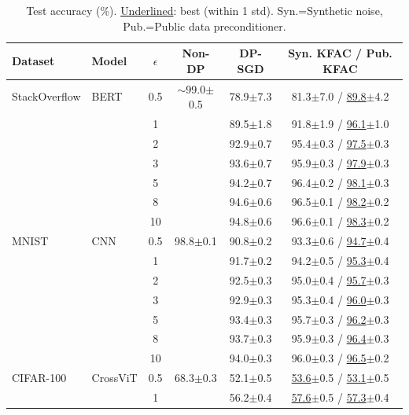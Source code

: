 \documentclass{article}
\theoremstyle{plain}
\theoremstyle{definition}
\theoremstyle{remark}
\begin{document}
\begin{table}[h!]
\centering
\footnotesize
\setlength{\tabcolsep}{4pt}
\caption{Test accuracy (\%). \underline{Underlined}: best (within 1 std). Syn.=Synthetic noise, Pub.=Public data preconditioner.}
\label{tab:results_comparison}
\begin{tabular}{ll c|c|cc}
\toprule
Dataset & Model & $\epsilon$ & Non-DP & DP-SGD & Syn. KFAC / Pub. KFAC \\
\midrule
StackOverflow & BERT & 0.5 & $\sim$99.0{\tiny$\pm$0.5} & 78.9{\tiny$\pm$7.3} & 81.3{\tiny$\pm$7.0} / \underline{89.8}{\tiny$\pm$4.2} \\
 & & 1 & & 89.5{\tiny$\pm$1.8} & 91.8{\tiny$\pm$1.9} / \underline{96.1}{\tiny$\pm$1.0} \\
 & & 2 & & 92.9{\tiny$\pm$0.7} & 95.4{\tiny$\pm$0.3} / \underline{97.5}{\tiny$\pm$0.3} \\
 & & 3 & & 93.6{\tiny$\pm$0.7} & 95.9{\tiny$\pm$0.3} / \underline{97.9}{\tiny$\pm$0.3} \\
 & & 5 & & 94.2{\tiny$\pm$0.7} & 96.4{\tiny$\pm$0.2} / \underline{98.1}{\tiny$\pm$0.3} \\
 & & 8 & & 94.6{\tiny$\pm$0.6} & 96.5{\tiny$\pm$0.1} / \underline{98.2}{\tiny$\pm$0.2} \\
 & & 10 & & 94.8{\tiny$\pm$0.6} & 96.6{\tiny$\pm$0.1} / \underline{98.3}{\tiny$\pm$0.2} \\
\midrule
MNIST & CNN & 0.5 & 98.8{\tiny$\pm$0.1} & 90.8{\tiny$\pm$0.2} & 93.3{\tiny$\pm$0.6} / \underline{94.7}{\tiny$\pm$0.4} \\
 & & 1 & & 91.7{\tiny$\pm$0.2} & 94.2{\tiny$\pm$0.5} / \underline{95.3}{\tiny$\pm$0.4} \\
 & & 2 & & 92.5{\tiny$\pm$0.3} & 95.0{\tiny$\pm$0.4} / \underline{95.7}{\tiny$\pm$0.3} \\
 & & 3 & & 92.9{\tiny$\pm$0.3} & 95.3{\tiny$\pm$0.4} / \underline{96.0}{\tiny$\pm$0.3} \\
 & & 5 & & 93.4{\tiny$\pm$0.3} & 95.7{\tiny$\pm$0.3} / \underline{96.2}{\tiny$\pm$0.3} \\
 & & 8 & & 93.7{\tiny$\pm$0.3} & 95.9{\tiny$\pm$0.3} / \underline{96.4}{\tiny$\pm$0.3} \\
 & & 10 & & 94.0{\tiny$\pm$0.3} & 96.0{\tiny$\pm$0.3} / \underline{96.5}{\tiny$\pm$0.2} \\
\midrule
CIFAR-100 & CrossViT & 0.5 & 68.3{\tiny$\pm$0.3} & 52.1{\tiny$\pm$0.5} & \underline{53.6}{\tiny$\pm$0.5} / \underline{53.1}{\tiny$\pm$0.5} \\
 & & 1 & & 56.2{\tiny$\pm$0.4} & \underline{57.6}{\tiny$\pm$0.5} / \underline{57.3}{\tiny$\pm$0.4} \\

\end{tabular}
\end{table}
\end{document}
